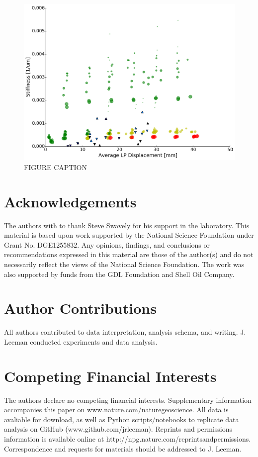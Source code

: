 \documentclass[11pt]{article}
\begin{document}
\begin{figure}
	\centering
		\includegraphics[scale=1.0]{../Figures/Fig_Stiffness_Evolution/Stiffness_Evolution.pdf}
   	\caption{FIGURE CAPTION}
  	\label{Figure:Stiffness Evolution}
\end{figure}



\section{Acknowledgements}
The authors with to thank Steve Swavely for his support in the laboratory. This
material is based upon work supported by the National Science Foundation under
Grant No. DGE1255832.  Any opinions, findings, and conclusions or
recommendations expressed in this material are those of the author(s) and do not
necessarily reflect the views of the National Science Foundation. The work was
also supported by funds from the GDL Foundation and Shell Oil Company.

\section{Author Contributions}
All authors contributed to data interpretation, analysis schema, and writing.
J. Leeman conducted experiments and data analysis.

\section{Competing Financial Interests}
The authors declare no competing financial interests. Supplementary information
accompanies this paper on www.nature.com/naturegeoscience. All data is avaliable
for download, as well as Python scripts/notebooks to replicate data analysis on
GitHub (www.github.com/jrleeman). Reprints and permissions information is
available online at http://npg.nature.com/reprintsandpermissions. Correspondence
and requests for materials should be addressed to J. Leeman.
\end{document}
